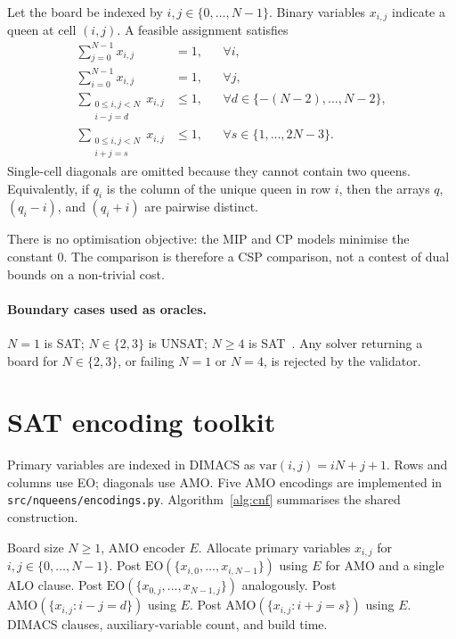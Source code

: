 \documentclass[a4paper,fleqn]{cas-sc}
\begin{document}
Let the board be indexed by $i,j\in\{0,\dots,N-1\}$.
Binary variables $x_{i,j}$ indicate a queen at cell $(i,j)$.
A feasible assignment satisfies
\begin{align}
\sum_{j=0}^{N-1} x_{i,j} &= 1, && \forall i, \label{eq:row}\\
\sum_{i=0}^{N-1} x_{i,j} &= 1, && \forall j, \label{eq:col}\\
\sum_{\substack{0\le i,j<N\\ i-j=d}} x_{i,j} &\le 1, && \forall d\in\{-(N-2),\dots,N-2\}, \label{eq:diag}\\
\sum_{\substack{0\le i,j<N\\ i+j=s}} x_{i,j} &\le 1, && \forall s\in\{1,\dots,2N-3\}. \label{eq:adiag}
\end{align}
Single-cell diagonals are omitted because they cannot contain two queens.
Equivalently, if $q_i$ is the column of the unique queen in row $i$, then the arrays $q$, $(q_i-i)$, and $(q_i+i)$ are pairwise distinct.

There is no optimisation objective: the MIP and CP models minimise the constant $0$.
The comparison is therefore a CSP comparison, not a contest of dual bounds on a non-trivial cost.

\paragraph{Boundary cases used as oracles.}
$N=1$ is SAT; $N\in\{2,3\}$ is UNSAT; $N\ge 4$ is SAT~\cite{bell2009survey}.
Any solver returning a board for $N\in\{2,3\}$, or failing $N=1$ or $N=4$, is rejected by the validator.

\section{SAT encoding toolkit}
\label{sec:sat}

Primary variables are indexed in DIMACS as $\mathrm{var}(i,j)=iN+j+1$.
Rows and columns use EO; diagonals use AMO.
Five AMO encodings are implemented in \texttt{src/nqueens/encodings.py}.
Algorithm~\ref{alg:cnf} summarises the shared construction.

\begin{algorithm}[t]
\caption{Build an $N$-Queens CNF formula.}
\label{alg:cnf}
\begin{algorithmic}[1]
\REQUIRE Board size $N\ge 1$, AMO encoder $E$.
\STATE Allocate primary variables $x_{i,j}$ for $i,j\in\{0,\dots,N-1\}$.
    \STATE Post $\mathrm{EO}(\{x_{i,0},\dots,x_{i,N-1}\})$ using $E$ for AMO and a single ALO clause.
\ENDFOR
{}
    \STATE Post $\mathrm{EO}(\{x_{0,j},\dots,x_{N-1,j}\})$ analogously.
\ENDFOR
{}
    \STATE Post $\mathrm{AMO}(\{x_{i,j}: i-j=d\})$ using $E$.
\ENDFOR
{}
    \STATE Post $\mathrm{AMO}(\{x_{i,j}: i+j=s\})$ using $E$.
\ENDFOR
\RETURN DIMACS clauses, auxiliary-variable count, and build time.
\end{algorithmic}
\end{algorithm}
\end{document}
